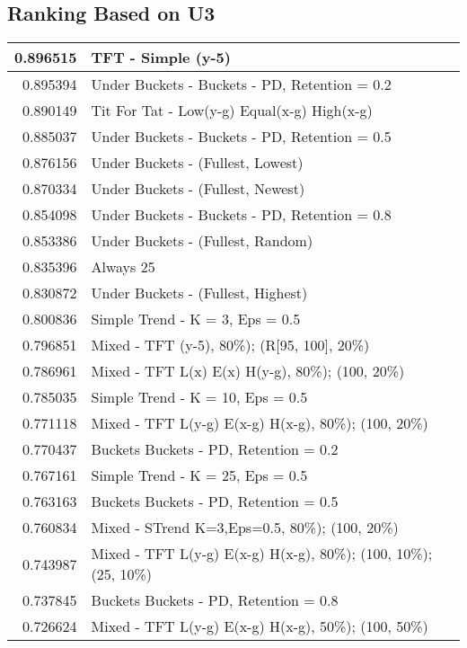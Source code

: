\begin{table}[!hbtp]
\subsection{Ranking Based on U3}
\begin{footnotesize}
\begin{tabular}{|r|l|}\hline  \label{U3results}
0.896515 & TFT - Simple (y-5)\\ \hline
0.895394 & Under Buckets - Buckets - PD, Retention = 0.2\\ \hline
0.890149 & Tit For Tat - Low(y-g) Equal(x-g) High(x-g)\\ \hline
0.885037 & Under Buckets - Buckets - PD, Retention = 0.5\\ \hline
0.876156 & Under Buckets - (Fullest, Lowest)\\ \hline
0.870334 & Under Buckets - (Fullest, Newest)\\ \hline
0.854098 & Under Buckets - Buckets - PD, Retention = 0.8\\ \hline
0.853386 & Under Buckets - (Fullest, Random)\\ \hline
0.835396 & Always 25\\ \hline
0.830872 & Under Buckets - (Fullest, Highest)\\ \hline
0.800836 & Simple Trend - K = 3, Eps = 0.5\\ \hline
0.796851 & Mixed - {TFT (y-5), 80\%); (R[95, 100], 20\%)}\\ \hline
0.786961 & Mixed - {TFT L(x) E(x) H(y-g), 80\%); (100, 20\%)}\\ \hline
0.785035 & Simple Trend - K = 10, Eps = 0.5\\ \hline
0.771118 & Mixed - {TFT L(y-g) E(x-g) H(x-g), 80\%); (100, 20\%)}\\ \hline
0.770437 & Buckets Buckets - PD, Retention = 0.2\\ \hline
0.767161 & Simple Trend - K = 25, Eps = 0.5\\ \hline
0.763163 & Buckets Buckets - PD, Retention = 0.5\\ \hline
0.760834 & Mixed - {STrend K=3,Eps=0.5, 80\%); (100, 20\%)}\\ \hline
0.743987 & Mixed - {TFT L(y-g) E(x-g) H(x-g), 80\%); (100, 10\%); (25, 10\%)}\\ \hline
0.737845 & Buckets Buckets - PD, Retention = 0.8\\ \hline
0.726624 & Mixed - {TFT L(y-g) E(x-g) H(x-g), 50\%); (100, 50\%)}\\ \hline

\end{tabular}
\end{footnotesize}
\end{table}
